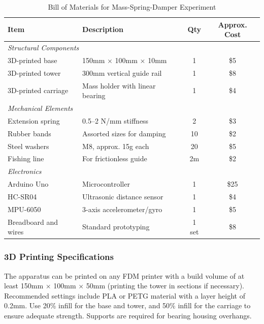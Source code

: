 \begin{table}[htbp]
\centering
\caption{Bill of Materials for Mass-Spring-Damper Experiment}
\label{tab:bom}
\begin{tabular}{llcc}
\toprule
\textbf{Item} & \textbf{Description} & \textbf{Qty} & \textbf{Approx. Cost} \\
\midrule
\multicolumn{4}{l}{\textit{Structural Components}} \\
3D-printed base & 150mm $\times$ 100mm $\times$ 10mm & 1 & \$5 \\
3D-printed tower & 300mm vertical guide rail & 1 & \$8 \\
3D-printed carriage & Mass holder with linear bearing & 1 & \$4 \\
\midrule
\multicolumn{4}{l}{\textit{Mechanical Elements}} \\
Extension spring & 0.5--2 N/mm stiffness & 2 & \$3 \\
Rubber bands & Assorted sizes for damping & 10 & \$2 \\
Steel washers & M8, approx. 15g each & 20 & \$5 \\
Fishing line & For frictionless guide & 2m & \$2 \\
\midrule
\multicolumn{4}{l}{\textit{Electronics}} \\
Arduino Uno & Microcontroller & 1 & \$25 \\
HC-SR04 & Ultrasonic distance sensor & 1 & \$4 \\
MPU-6050 & 3-axis accelerometer/gyro & 1 & \$5 \\
Breadboard and wires & Standard prototyping & 1 set & \$8 \\
\bottomrule
\end{tabular}
\end{table}

\subsubsection{3D Printing Specifications}

The apparatus can be printed on any FDM printer with a build volume of at least 150mm $\times$ 100mm $\times$ 50mm (printing the tower in sections if necessary). Recommended settings include PLA or PETG material with a layer height of 0.2mm. Use 20\% infill for the base and tower, and 50\% infill for the carriage to ensure adequate strength. Supports are required for bearing housing overhangs.

